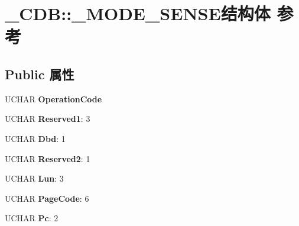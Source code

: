 \hypertarget{struct___c_d_b_1_1___m_o_d_e___s_e_n_s_e}{}\section{\+\_\+\+C\+DB\+:\+:\+\_\+\+M\+O\+D\+E\+\_\+\+S\+E\+N\+S\+E结构体 参考}
\label{struct___c_d_b_1_1___m_o_d_e___s_e_n_s_e}
\subsection*{Public 属性}
\begin{DoxyCompactItemize}
\item 
\mbox{\label{struct___c_d_b_1_1___m_o_d_e___s_e_n_s_e_a4c1553cc55b0a0e61ce193586dd6bd33}} 
U\+C\+H\+AR {\bfseries Operation\+Code}
\item 
\mbox{\label{struct___c_d_b_1_1___m_o_d_e___s_e_n_s_e_a436a1f485968c8f7c690e6db4793c2e8}} 
U\+C\+H\+AR {\bfseries Reserved1}\+: 3
\item 
\mbox{\label{struct___c_d_b_1_1___m_o_d_e___s_e_n_s_e_ad5f96573b70f8ed6461c7ff8efd84891}} 
U\+C\+H\+AR {\bfseries Dbd}\+: 1
\item 
\mbox{\label{struct___c_d_b_1_1___m_o_d_e___s_e_n_s_e_afdc0049b7d170812a49b5bd5f0af40e0}} 
U\+C\+H\+AR {\bfseries Reserved2}\+: 1
\item 
\mbox{\label{struct___c_d_b_1_1___m_o_d_e___s_e_n_s_e_a4ebdb011e398beff09f977664cb15096}} 
U\+C\+H\+AR {\bfseries Lun}\+: 3
\item 
\mbox{\label{struct___c_d_b_1_1___m_o_d_e___s_e_n_s_e_aee720797e6efe0b6b545595c5d8adae9}} 
U\+C\+H\+AR {\bfseries Page\+Code}\+: 6
\item 
\mbox{\label{struct___c_d_b_1_1___m_o_d_e___s_e_n_s_e_afd1702aa59cef69fc2518e079b257335}} 
U\+C\+H\+AR {\bfseries Pc}\+: 2
\item 

\end{DoxyCompactItemize}
